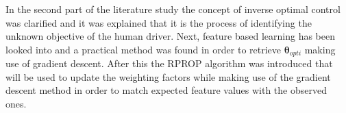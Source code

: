 In the second part of the literature study the concept of inverse optimal control was clarified and it was explained that it is the process of identifying the unknown objective of the human driver. Next, feature based learning has been looked into and a practical method was found in order to retrieve $\bm{\theta}_{opti}$ making use of gradient descent. After this the RPROP algorithm was introduced that will be used to update the weighting factors while making use of the gradient descent method in order to match expected feature values with the observed ones.

\newpage


%

